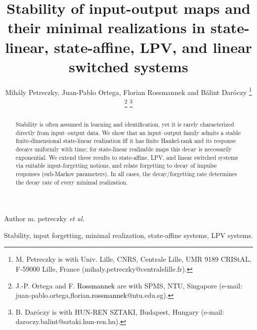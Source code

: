 \documentclass[journal,twoside,web]{ieeecolor}
\begin{document}
\def\BibTeX{{\rm B\kern-.05em{\sc i\kern-.025em b}\kern-.08em
    T\kern-.1667em\lower.7ex\hbox{E}\kern-.125emX}}
{Author \MakeLowercase{M. Petreczky \textit{et al.}}}

\title{Stability of input-output maps and their minimal realizations  in  state-linear, state-affine, LPV, and linear switched systems}

\author{Mihály Petreczky, Juan-Pablo Ortega,
Florian Rossmannek and 
Bálint Daróczy
\thanks{M. Petreczky is with Univ. Lille, CNRS,
 Centrale Lille, UMR 9189 CRIStAL, F-59000 Lille, France
  (mihaly.petreczky@centralelille.fr).}
\thanks{J.-P. Ortega and 
F. \textcolor{black}{Rossmannek} are with SPMS, NTU, Singapore
  (e-mail: juan-{pablo.ortega,florian.\textcolor{black}{rossmannek}}@ntu.edu.sg).}  
\thanks{B. Daróczy is with
HUN-REN SZTAKI, Budapest, Hungary (e-mail: daroczy.balint@sztaki.hun-ren.hu).}}


\maketitle 
\thispagestyle{empty}

\begin{abstract}
      Stability is often assumed in learning and identification, yet it is rarely characterized directly from input--output data. We show that an input--output family admits a stable finite-dimensional state-linear realization iff it has finite Hankel-rank and its response decays uniformly with time; for state-linear realizable maps this decay is necessarily exponential. We extend these results to state-affine, LPV, and linear switched systems via suitable input-forgetting notions, and relate forgetting to decay of impulse responses (sub-Markov parameters). In all cases, the decay/forgetting rate determines the decay rate of every minimal realization.
\end{abstract}
\begin{IEEEkeywords}
Stability, input forgetting, minimal realization, state-affine systems, LPV systems. 
\end{IEEEkeywords}
\end{document}
